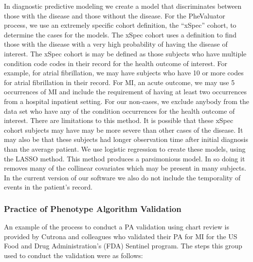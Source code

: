 \documentclass[11pt]{book}
\theoremstyle{definition}
\theoremstyle{definition}
\theoremstyle{definition}
\theoremstyle{remark}
\begin{document}
\begin{enumerate}
  In diagnostic predictive modeling we create a model that discriminates between those with the disease and those without the disease. For the PheValuator process, we use an extremely specific cohort definition, the ``xSpec'' cohort, to determine the cases for the models. The xSpec cohort uses a definition to find those with the disease with a very high probability of having the disease of interest. The xSpec cohort is may be defined as those subjects who have multiple condition code codes in their record for the health outcome of interest. For example, for atrial fibrillation, we may have subjects who have 10 or more codes for atrial fibrillation in their record. For MI, an acute outcome, we may use 5 occurrences of MI and include the requirement of having at least two occurrences from a hospital inpatient setting. For our non-cases, we exclude anybody from the data set who have any of the condition occurrences for the health outcome of interest. There are limitations to this method. It is possible that these xSpec cohort subjects may have may be more severe than other cases of the disease. It may also be that these subjects had longer observation time after initial diagnosis than the average patient. We use logistic regression to create these models, using the LASSO method.\citep{tibshirani_regression_1996} This method produces a parsimonious model. In so doing it removes many of the collinear covariates which may be present in many subjects. In the current version of our software we also do not include the temporality of events in the patient's record.
\end{enumerate}

\hypertarget{practice-of-phenotype-algorithm-validation}{%
\subsubsection*{Practice of Phenotype Algorithm Validation}\label{practice-of-phenotype-algorithm-validation}}

An example of the process to conduct a PA validation using chart review is provided by Cutrona and colleagues who validated their PA for MI for the US Food and Drug Administration's (FDA) Sentinel program.\citep{cutrona_validation_2013} The steps this group used to conduct the validation were as follows: 
\end{document}

